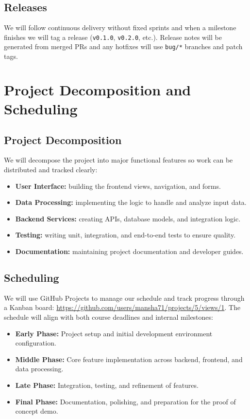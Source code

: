 \documentclass{article}
\begin{document}
\subsection*{Releases}
We will follow continuous delivery without fixed sprints and when a milestone finishes we will tag a release (\texttt{v0.1.0}, \texttt{v0.2.0}, etc.). Release notes will be generated from merged PRs and any hotfixes will use \texttt{bug/*} branches and patch tags.

\section{Project Decomposition and Scheduling}

\subsection*{Project Decomposition}
We will decompose the project into major functional features so work can be distributed and tracked clearly:
\begin{itemize}
  \item \textbf{User Interface:} building the frontend views, navigation, and forms.
  \item \textbf{Data Processing:} implementing the logic to handle and analyze input data.
  \item \textbf{Backend Services:} creating APIs, database models, and integration logic.
  \item \textbf{Testing:} writing unit, integration, and end-to-end tests to ensure quality.
  \item \textbf{Documentation:} maintaining project documentation and developer guides.
\end{itemize}

\subsection*{Scheduling}
We will use GitHub Projects to manage our schedule and track progress through a
Kanban board: \url{https://github.com/users/mansha71/projects/5/views/1}.  
The schedule will align with both course deadlines and internal milestones:
\begin{itemize}
  \item \textbf{Early Phase:} Project setup and initial development environment configuration.
  \item \textbf{Middle Phase:} Core feature implementation across backend, frontend, and data processing.
  \item \textbf{Late Phase:} Integration, testing, and refinement of features.
  \item \textbf{Final Phase:} Documentation, polishing, and preparation for the proof of concept demo.
\end{itemize}
\end{document}

